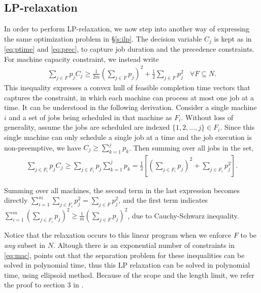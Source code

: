 \subsection{LP-relaxation} \label{s:lprd}
In order to perform LP-relaxation, we now step into another way of expressing the same optimization problem in \S\ref{s:ilp}. The decision variable $C_j$ is kept as in \eqref{eq:ptime} and \eqref{eq:prec}, to capture job duration and the precedence constraints. For machine capacity constraint, we instead write
\begin{align}
\sum_{j\in F} p_j C_j \geq \frac{1}{2m}\left(\sum_{j\in F} p_j \right)^2 + \frac{1}{2}\sum_{j\in F}p_j^2 \:\:\:\: \forall F \subseteq N. \label{eq:mac}
\end{align}
This inequality expresses a convex hull of feasible completion time vectors that captures the constraint, in which each machine can process at most one job at a time. It can be understood in the following derivation. Consider a single machine $i$ and a set of jobs being scheduled in that machine as $F_i$. Without loss of generality, assume the jobs are scheduled are indexed $\{1,2,...,j\} \in F_i$. Since this single machine can only schedule a single job at a time and the job execution is non-preemptive, we have $C_j \geq \sum_{k=1}^j p_k$. Then summing over all jobs in the set, 
\begin{align}
\sum_{j\in F_i} p_j C_j \geq \sum_{j\in F_i} p_j \sum_{k=1}^j p_k = \frac{1}{2} \left[ \left(\sum_{j\in F_i} p_j\right)^2 + \sum_{j\in F_i}p_j^2\right]. \label{eq:ch}
\end{align}

Summing over all machines, the second term in the last expression becomes directly $\sum_{i=1}^m \sum_{j\in F_i}p_j^2 = \sum_{j\in F}p_j^2$, and the first term indicates $\sum_{i=1}^m\left(\sum_{j\in F_i} p_j\right)^2 \geq \frac{1}{m}\left(\sum_{j\in F} p_j\right)^2$, due to Cauchy-Schwarz inequality. 

Notice that the relaxation occurs to this linear program when we enforce $F$ to be \emph{any} subset in $N$. Altough there is an exponential number of constraints in \eqref{eq:mac}, \cite{queyranne2006approximation} points out that the separation problem for these inequalities can be solved in polynomial time, thus this LP relaxation can be solved in polynomial time, using ellipsoid method. Because of the scope and the length limit, we refer the proof to section 3 in \cite{schulz1996scheduling}.

